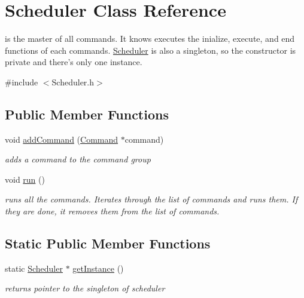 \hypertarget{classScheduler}{\section{Scheduler Class Reference}
\label{classScheduler}
}


is the master of all commands. It knows executes the inialize, execute, and end functions of each commands. \hyperlink{classScheduler}{Scheduler} is also a singleton, so the constructor is private and there's only one instance.  




{\ttfamily \#include $<$Scheduler.\-h$>$}

\subsection*{Public Member Functions}
\begin{DoxyCompactItemize}
\item 
void \hyperlink{classScheduler_a73f2e49a61315d8138cfce5b180fd891}{add\-Command} (\hyperlink{classCommand}{Command} $\ast$command)
\begin{DoxyCompactList}\small\item\em adds a command to the command group \end{DoxyCompactList}\item 
void \hyperlink{classScheduler_a58fba108ce2748870a6288cd6f5fd1e3}{run} ()
\begin{DoxyCompactList}\small\item\em runs all the commands. Iterates through the list of commands and runs them. If they are done, it removes them from the list of commands. \end{DoxyCompactList}\end{DoxyCompactItemize}
\subsection*{Static Public Member Functions}
\begin{DoxyCompactItemize}
\item 
static \hyperlink{classScheduler}{Scheduler} $\ast$ \hyperlink{classScheduler_a3fc3905ac5589d51e464100f3b8c0138}{get\-Instance} ()
\begin{DoxyCompactList}\small\item\em returns pointer to the singleton of scheduler \end{DoxyCompactList}\end{DoxyCompactItemize}
